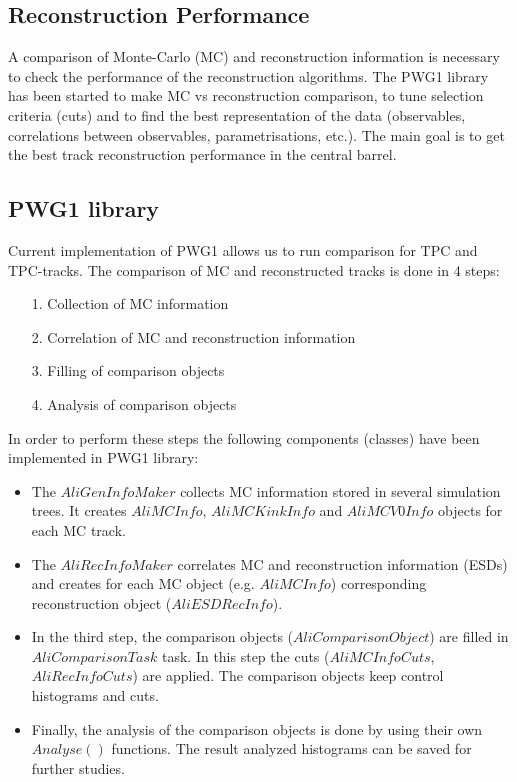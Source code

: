 \documentclass{elsart}
\begin{document}
\subsection{Reconstruction Performance}

A comparison of Monte-Carlo (MC) and reconstruction information is necessary to 
check the performance of the reconstruction algorithms. The PWG1 library has been started to make 
MC vs reconstruction comparison, to tune selection criteria (cuts) and to find the best representation 
of the data (observables, correlations between observables, parametrisations, etc.). The main goal is to 
get the best track reconstruction performance in the central barrel.   

\subsection{PWG1 library}

Current implementation of PWG1 allows us to run comparison for TPC and TPC-tracks.
The comparison of MC and reconstructed tracks is done in 4 steps: 

\begin{itemize}
\item[1.] Collection of MC information
\item[2.] Correlation of MC and reconstruction information
\item[3.] Filling of comparison objects
\item[4.] Analysis of comparison objects
\end{itemize}
 
In order to perform these steps the following 
components (classes) have been implemented in PWG1 library:

\begin{itemize}
\item The $AliGenInfoMaker$ collects MC information stored in 
 several simulation trees. It creates $AliMCInfo$, $AliMCKinkInfo$ and $AliMCV0Info$ objects for each MC track.  
\item The $AliRecInfoMaker$ correlates MC and reconstruction information (ESDs) and creates for each MC object (e.g. $AliMCInfo$) corresponding reconstruction object ($AliESDRecInfo$). 
\item In the third step, the comparison objects ($AliComparisonObject$)  are filled in $AliComparisonTask$ task. In this step the cuts ($AliMCInfoCuts$, $AliRecInfoCuts$) are applied. The comparison objects keep control histograms and cuts. 
\item Finally, the analysis of the comparison objects is done by using their own $Analyse()$ 
      functions. The result analyzed histograms can be saved for further studies.
\end{itemize}
 
\end{document}
